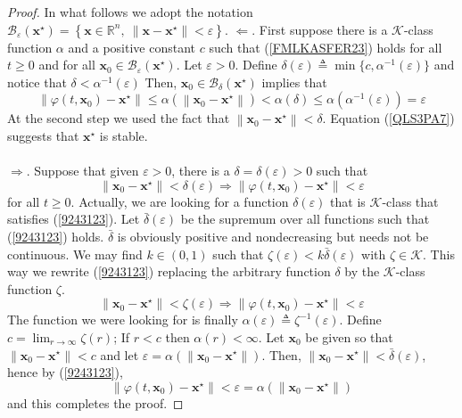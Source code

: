 \documentclass[a4paper,10pt,oneside]{book}
\begin{document}
\begin{proof}
In what follows we adopt the notation $\mathcal{B}_{\varepsilon}(\mathbf{x}^\star)=\left\{
\mathbf{x}\in\mathbb{R}^n,\ \|\mathbf{x}-\mathbf{x}^\star\|<\varepsilon
\right\}$.
%
%
 $\Leftarrow.$ First suppose there is a $\mathcal{K}$-class function $\alpha$
and a positive constant $c$ such that (\ref{FMLKASFER23}) holds for all 
$t\geq 0$ and for all $\mathbf x_0\in\mathcal{B}_{\varepsilon}(\mathbf{x}^\star)$.
Let $\varepsilon>0$. Define $\delta(\varepsilon)\triangleq\min\{c,\alpha^{-1}(\varepsilon)\}$
and notice that $\delta<\alpha^{-1}(\varepsilon)$
Then, $\mathbf{x}_0\in\mathcal{B}_{\delta}(\mathbf{x}^\star)$ implies that
\begin{equation}\label{QLS3PA7}
 \|\varphi(t,\mathbf{x}_0)-\mathbf{x}^\star\|\leq
\alpha\left(\left\| \mathbf{x}_0-\mathbf{x}^\star \right\|\right)
< \alpha(\delta)\leq \alpha(\alpha^{-1}(\varepsilon))=\varepsilon
\end{equation}
At the second step we used the fact that $\left\| \mathbf{x}_0-\mathbf{x}^\star \right\|<\delta$.
Equation (\ref{QLS3PA7}) suggests that $\mathbf{x}^\star$ is stable.\\
\\
$\Rightarrow.$ Suppose that given $\varepsilon>0$, there is a $\delta=\delta(\varepsilon)>0$
such that 
\begin{equation}\label{9243123}
 \|\mathbf{x}_0-\mathbf{x}^\star\|<\delta(\varepsilon) \Rightarrow \|\varphi(t,\mathbf{x}_0)-\mathbf{x}^\star\|<\varepsilon
\end{equation}
for all $t\geq 0$. 
Actually, we are looking for a function $\delta(\varepsilon)$ that is $\mathcal{K}$-class that 
satisfies (\ref{9243123}).
Let $\bar{\delta}(\varepsilon)$ be the supremum over all functions such that (\ref{9243123})
holds. $\bar{\delta}$ is obviously positive and nondecreasing but needs not be continuous.
We may find $k\in(0,1)$ such that $\zeta(\varepsilon)<k\bar{\delta}(\varepsilon)$ with $\zeta\in\mathcal K$.
This way we rewrite (\ref{9243123}) replacing the arbitrary function $\delta$ by the $\mathcal K$-class
function $\zeta$.
\begin{equation}
 \|\mathbf{x}_0-\mathbf{x}^\star\|<\zeta(\varepsilon) \Rightarrow \|\varphi(t,\mathbf{x}_0)-\mathbf{x}^\star\|<\varepsilon
\end{equation}
The function we were looking for is finally $\alpha(\varepsilon)\triangleq\zeta^{-1}(\varepsilon)$. Define
$c=\lim_{r\to\infty}\zeta(r)$; If $r<c$ then $\alpha(r)<\infty$. Let $\mathbf{x}_0$ be given so that
$\|\mathbf{x}_0-\mathbf{x}^\star\|<c$ and let $\varepsilon=\alpha(\|\mathbf{x}_0-\mathbf{x}^\star\|)$.
Then, $\|\mathbf{x}_0-\mathbf{x}^\star\|<\bar{\delta}(\varepsilon)$, hence by (\ref{9243123}),
\begin{equation}
 \|\varphi(t,\mathbf{x}_0)-\mathbf{x}^\star\|<\varepsilon=\alpha(\|\mathbf{x}_0-\mathbf{x}^\star\|)
\end{equation}
and this completes the proof.
\end{proof}
\end{document}
